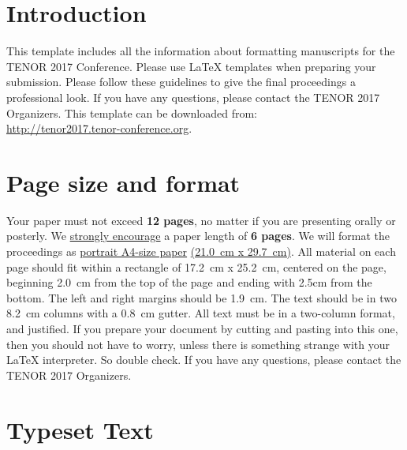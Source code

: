 \documentclass{article}
\title{\papertitle}
\begin{document}
%
\capstartfalse
\maketitle
\capstarttrue
%
\begin{abstract}
Place your abstract at the top left column on the first page.
Please write about 150-200 words that specifically highlight the purpose of your work,
its context, and provide a brief synopsis of your results.
Avoid equations in this part.
\end{abstract}
%

\section{Introduction}\label{sec:introduction}
This template includes all the information about formatting manuscripts for 
the TENOR 2017 Conference.
Please use \LaTeX{} templates when 
preparing your submission.
Please follow these guidelines to give the final proceedings a professional look.
If you have any questions, please contact the TENOR 2017 Organizers.
This template can be downloaded from:\\
\url{http://tenor2017.tenor-conference.org}.

\section{Page size and format}\label{sec:page_size}
Your paper must not exceed {\bf 12 pages},
no matter if you are presenting orally or posterly.
We \underline{strongly encourage}
a paper length of {\bf 6 pages}.
We will format the proceedings as
 \underline{portrait A4-size paper} \underline{(21.0~cm x 29.7~cm)}.
All material on each page should fit within a rectangle of 17.2~cm x 25.2~cm,
centered on the page, beginning 2.0~cm from the top of the page and ending 
with 2.5cm from the bottom.
The left and right margins should be 1.9~cm.
The text should be in two 8.2~cm columns with a 0.8~cm gutter.
All text must be in a two-column format, and justified.
If you prepare your document by cutting and pasting into this one,
then you should not have to worry, 
unless there is something strange with your \LaTeX{} interpreter.
So double check.
If you have any questions, please contact the TENOR 2017 Organizers.

\section{Typeset Text}\label{sec:typeset_text}
\end{document}
